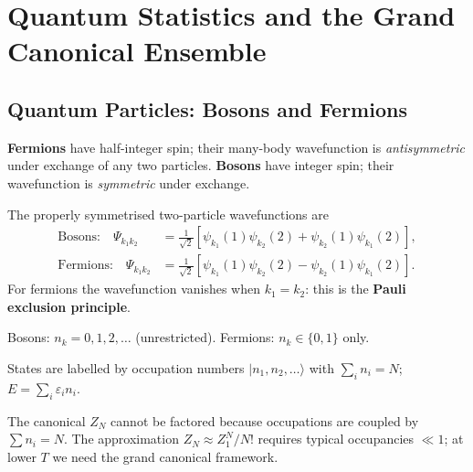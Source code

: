 
\chapter{Quantum Statistics and the Grand Canonical Ensemble}

\section{Quantum Particles: Bosons and Fermions}

\begin{definition}
\textbf{Fermions} have half-integer spin; their many-body wavefunction is
\emph{antisymmetric} under exchange of any two particles.  \textbf{Bosons}
have integer spin; their wavefunction is \emph{symmetric} under exchange.
\end{definition}

The properly symmetrised two-particle wavefunctions are
\begin{align}
    \text{Bosons:}\quad
    \Psi_{k_1k_2}
    &= \frac{1}{\sqrt{2}}\!\left[\psi_{k_1}(1)\psi_{k_2}(2)
       +\psi_{k_2}(1)\psi_{k_1}(2)\right],\\
    \text{Fermions:}\quad
    \Psi_{k_1k_2}
    &= \frac{1}{\sqrt{2}}\!\left[\psi_{k_1}(1)\psi_{k_2}(2)
       -\psi_{k_2}(1)\psi_{k_1}(2)\right].
\end{align}
For fermions the wavefunction vanishes when $k_1 = k_2$: this is the
\textbf{Pauli exclusion principle}.

\begin{fact}
Bosons: $n_k = 0, 1, 2, \ldots$ (unrestricted).
Fermions: $n_k \in \{0, 1\}$ only.
\end{fact}

States are labelled by occupation numbers $|n_1, n_2, \ldots\rangle$ with $\sum_i n_i = N$; $E = \sum_i \varepsilon_i n_i$.

The canonical $Z_N$ cannot be factored because occupations are coupled by $\sum n_i = N$. The approximation $Z_N \approx Z_1^N/N!$ requires typical occupancies $\ll 1$; at lower $T$ we need the grand canonical framework.

